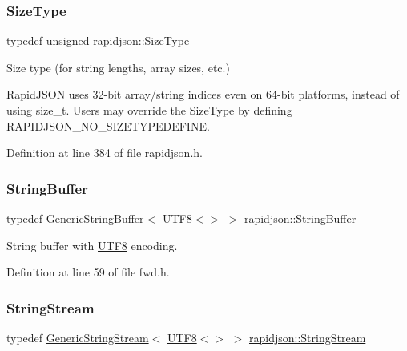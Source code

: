 \subsubsection{\texorpdfstring{SizeType}{SizeType}}
{\footnotesize\ttfamily typedef unsigned \mbox{\hyperlink{namespacerapidjson_a44eb33eaa523e36d466b1ced64b85c84}{rapidjson\+::\+Size\+Type}}}



Size type (for string lengths, array sizes, etc.) 

Rapid\+J\+S\+ON uses 32-\/bit array/string indices even on 64-\/bit platforms, instead of using {\ttfamily size\+\_\+t}. Users may override the Size\+Type by defining R\+A\+P\+I\+D\+J\+S\+O\+N\+\_\+\+N\+O\+\_\+\+S\+I\+Z\+E\+T\+Y\+P\+E\+D\+E\+F\+I\+NE. 

Definition at line 384 of file rapidjson.\+h.

\mbox{\label{namespacerapidjson_ac0765ea91f41539645c4b78689d03f21}} 
\subsubsection{\texorpdfstring{StringBuffer}{StringBuffer}}
{\footnotesize\ttfamily typedef \mbox{\hyperlink{classrapidjson_1_1_generic_string_buffer}{Generic\+String\+Buffer}}$<$ \mbox{\hyperlink{structrapidjson_1_1_u_t_f8}{U\+T\+F8}}$<$$>$ $>$ \mbox{\hyperlink{namespacerapidjson_ac0765ea91f41539645c4b78689d03f21}{rapidjson\+::\+String\+Buffer}}}



String buffer with \mbox{\hyperlink{structrapidjson_1_1_u_t_f8}{U\+T\+F8}} encoding. 



Definition at line 59 of file fwd.\+h.

\mbox{\label{namespacerapidjson_a021f77051e9f85188fc2f71ff5a15ebc}} 
\subsubsection{\texorpdfstring{StringStream}{StringStream}}
{\footnotesize\ttfamily typedef \mbox{\hyperlink{structrapidjson_1_1_generic_string_stream}{Generic\+String\+Stream}}$<$ \mbox{\hyperlink{structrapidjson_1_1_u_t_f8}{U\+T\+F8}}$<$$>$ $>$ \mbox{\hyperlink{namespacerapidjson_a021f77051e9f85188fc2f71ff5a15ebc}{rapidjson\+::\+String\+Stream}}}



